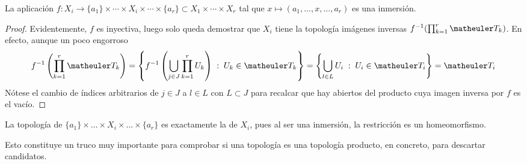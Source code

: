 \begin{prop}[Inmersiones]
	\label{const_prop_inmersion}
	La aplicación $f : X_i\to\{a_1\}\times\cdots\times X_i\times\cdots\times \{a_r\}\subset X_1\times\cdots\times X_r$ tal que $x\mapsto (a_1,\dots,x,\dots,a_r)$ es una inmersión.
	
	\begin{proof}
		Evidentemente, $f$ es inyectiva, luego solo queda demostrar que $X_i$ tiene la topología imágenes inversas $f^{-1}(\prod_{k=1}^r\T_k)$. En efecto, aunque un poco engorroso
		\begin{equation*}
			f^{-1}\left(\prod_{k=1}^r\T_k\right)=\left\{f^{-1}\left(\bigcup_{j\in J}\prod_{k=1}^r U_k\right)\midc U_k\in\T_k\right\}=\left\{\bigcup_{l\in L}U_i\midc U_i\in\T_i\right\}=\T_i
		\end{equation*}
		Nótese el cambio de índices arbitrarios de $j\in J$ a $l\in L$ con $L\subset J$ para recalcar que hay abiertos del producto cuya imagen inversa por $f$ es el vacío. 
	\end{proof}
\end{prop}
\begin{obs}[Consecuencias]
	La topología de $\{a_1\}\times\dots\times X_i \times \dots \times\{a_r\}$ es exactamente la de $X_i$, pues al ser una inmersión, la restricción es un homeomorfismo.
	
	Esto constituye un truco muy importante para comprobar si una topología es una topología producto, en concreto, para descartar candidatos.
\end{obs}

